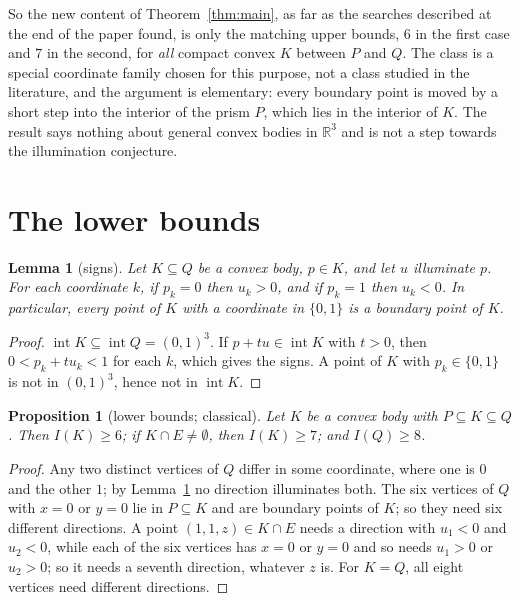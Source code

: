 \documentclass[11pt]{article}
\newtheorem{lemma}{Lemma}
\newtheorem{proposition}{Proposition}
\theoremstyle{definition}
\theoremstyle{remark}
\newcommand{\R}{\mathbb R}
\newcommand{\inter}{\operatorname{int}}
\begin{document}
So the new content of Theorem~\ref{thm:main}, as far as the searches described
at the end of the paper found, is only the matching upper bounds,
$6$ in the first case and $7$ in the second, for \emph{all} compact convex $K$
between $P$ and $Q$. The class is a special coordinate family chosen for this
purpose, not a class studied in the literature, and the argument is
elementary: every boundary point is moved by a short step into the interior of
the prism $P$, which lies in the interior of $K$. The result says nothing about
general convex bodies in $\R^3$ and is not a step towards the illumination
conjecture.

\section{The lower bounds}\label{sec:lower}

\begin{lemma}[signs]\label{lem:signs}
Let $K\subseteq Q$ be a convex body, $p\in K$, and let $u$ illuminate $p$. For
each coordinate $k$, if $p_k=0$ then $u_k>0$, and if $p_k=1$ then $u_k<0$. In
particular, every point of $K$ with a coordinate in $\{0,1\}$ is a boundary
point of $K$.
\end{lemma}

\begin{proof}
$\inter K\subseteq\inter Q=(0,1)^3$. If $p+tu\in\inter K$ with $t>0$, then
$0<p_k+tu_k<1$ for each $k$, which gives the signs. A point of $K$ with
$p_k\in\{0,1\}$ is not in $(0,1)^3$, hence not in $\inter K$.
\end{proof}

\begin{proposition}[lower bounds; classical]\label{prop:lower}
Let $K$ be a convex body with $P\subseteq K\subseteq Q$. Then $I(K)\ge6$; if
$K\cap E\ne\emptyset$, then $I(K)\ge7$; and $I(Q)\ge8$.
\end{proposition}

\begin{proof}
Any two distinct vertices of $Q$ differ in some coordinate, where one is $0$
and the other $1$; by Lemma~\ref{lem:signs} no direction illuminates both. The
six vertices of $Q$ with $x=0$ or $y=0$ lie in $P\subseteq K$ and are boundary
points of $K$; so they need six different directions. A point $(1,1,z)\in
K\cap E$ needs a direction with $u_1<0$ and $u_2<0$, while each of the six
vertices has $x=0$ or $y=0$ and so needs $u_1>0$ or $u_2>0$; so it needs a
seventh direction, whatever $z$ is. For $K=Q$, all eight vertices need
different directions.
\end{proof}
\end{document}
